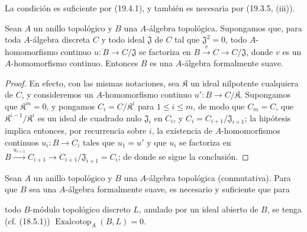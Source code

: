 La condición es suficiente por (19.4.1), y también es necesaria por
(19.3.5, (iii)).

\begin{proposition}[19.4.3]
\label{0.19.4.3-fr}
Sean $A$ un anillo topológico y $B$ una $A$-álgebra topológica. Supongamos
que, para toda $A$-álgebra discreta $C$ y todo ideal $\mathfrak J$ de $C$
tal que $\mathfrak J^2=0$, todo $A$-homomorfismo continuo
$u:B\to C/\mathfrak J$ se factoriza en
$B\xrightarrow{v}C\to C/\mathfrak J$, donde $v$ es un $A$-homomorfismo
continuo. Entonces $B$ es una $A$-álgebra formalmente suave.
\end{proposition}

\begin{proof}
En efecto, con las mismas notaciones, sea $\mathfrak K$ un ideal nilpotente
cualquiera de $C$, y consideremos un $A$-homomorfismo continuo
$u':B\to C/\mathfrak K$. Supongamos que $\mathfrak K^m=0$, y pongamos
$C_i=C/\mathfrak K^i$ para $1\leq i\leq m$, de modo que $C_m=C$, que
$\mathfrak K^{i-1}/\mathfrak K^i$ es un ideal de cuadrado nulo
$\mathfrak J_i$ en $C_i$, y $C_i=C_{i+1}/\mathfrak J_{i+1}$;
la hipótesis implica entonces, por recurrencia sobre $i$, la existencia de
$A$-homomorfismos continuos $u_i:B\to C_i$ tales que $u_1=u'$ y que $u_i$
se factoriza en
$B\xrightarrow{u_{i+1}}C_{i+1}\to C_{i+1}/\mathfrak J_{i+1}=C_i$;
de donde se sigue la conclusión.
\end{proof}

\begin{proposition}[19.4.4]
\label{0.19.4.4-fr}
Sean $A$ un anillo topológico y $B$ una $A$-álgebra topológica
(conmutativa). Para que $B$ sea una $A$-álgebra formalmente suave, es necesario y
suficiente que para


todo $B$-módulo topológico discreto $L$, anulado por un ideal abierto de $B$, se
tenga \textup{(cf. (18.5.1))}
$\operatorname{Exalcotop}_A(B,L)=0$.
\end{proposition}

